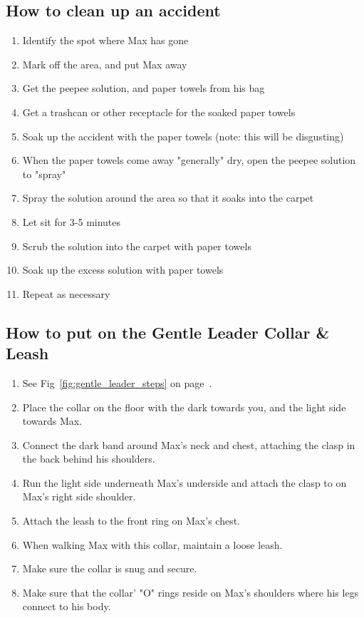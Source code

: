 \documentclass[pdftex,12pt]{article}
\begin{document}
\subsection{How to clean up an accident}
\begin{enumerate}\label{itm:how_to_clean_accident}
    \item Identify the spot where Max has gone
    \item Mark off the area, and put Max away
    \item Get the peepee solution, and paper towels from his bag
    \item Get a trashcan or other receptacle for the soaked paper towels
    \item Soak up the accident with the paper towels (note: this will be disgusting)
    \item When the paper towels come away "generally" dry, open the peepee solution to "spray"
    \item Spray the solution around the area so that it soaks into the carpet
    \item Let sit for 3-5 minutes
    \item Scrub the solution into the carpet with paper towels
    \item Soak up the excess solution with paper towels
    \item Repeat as necessary
\end{enumerate}

\subsection{How to put on the Gentle Leader Collar \& Leash}
\begin{enumerate}\label{itm:how_to_gentle_leader}
    \item See Fig~\ref{fig:gentle_leader_steps} on page~\pageref{fig:gentle_leader_steps}.
    \item Place the collar on the floor with the dark towards you, and
        the light side towards Max.
    \item Connect the dark band around Max's neck and chest, attaching the clasp
        in the back behind his shoulders.
    \item Run the light side underneath Max's underside and attach the clasp to
        on Max's right side shoulder.
    \item Attach the leash to the front ring on Max's chest.
    \item When walking Max with this collar, maintain a loose leash.
    \item Make sure the collar is snug and secure.
    \item Make sure that the collar' "O" rings reside on Max's shoulders where
        his legs connect to his body.
\end{enumerate}
\end{document}
